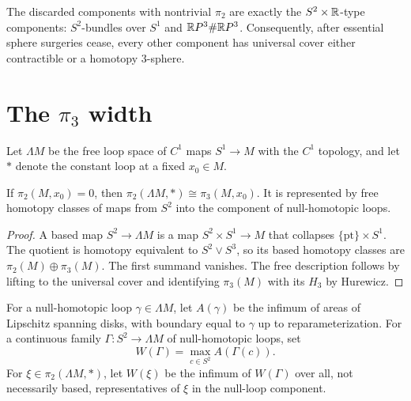 \begin{remark}
\label{rem:pi2-disappearing-components}

The discarded components with nontrivial $\pi_2$ are exactly the
$S^2\times\mathbb{R}$-type components: $S^2$-bundles over $S^1$ and
$\mathbb{R} P^3\#\mathbb{R} P^3$. Consequently, after essential sphere surgeries cease,
every other component has universal cover either contractible or a homotopy
$3$-sphere.
\end{remark}

\section{The $\pi_3$ width}

Let $\Lambda M$ be the free loop space of $C^1$ maps $S^1\to M$ with the
$C^1$ topology, and let $*$ denote the constant loop at a fixed $x_0\in M$.

\begin{claim}
\label{claim:loop-space-pi2-pi3-iso}
If $\pi_2(M,x_0)=0$, then
$\pi_2(\Lambda M,*)\cong\pi_3(M,x_0)$. It is represented by free homotopy
classes of maps from $S^2$ into the component of null-homotopic loops.
\end{claim}
\begin{proof}
\sketch A based map $S^2\to\Lambda M$ is a map $S^2\times S^1\to M$ that
collapses $\{\mathrm{pt}\}\times S^1$. The quotient is homotopy equivalent to
$S^2\vee S^3$, so its based homotopy classes are
$\pi_2(M)\oplus\pi_3(M)$. The first summand vanishes. The free description
follows by lifting to the universal cover and identifying $\pi_3(M)$ with its
$H_3$ by Hurewicz.
\end{proof}

\begin{definition}
\label{def:w-xi-spanning-disk-functional}
\label{Wdefn}

For a null-homotopic loop $\gamma\in\Lambda M$, let $A(\gamma)$ be the
infimum of areas of Lipschitz spanning disks, with boundary equal to $\gamma$
up to reparameterization. For a continuous family
$\Gamma\colon S^2\to\Lambda M$ of null-homotopic loops, set
\[
W(\Gamma)=\max_{c\in S^2}A(\Gamma(c)).
\]
For $\xi\in\pi_2(\Lambda M,*)$, let $W(\xi)$ be the infimum of $W(\Gamma)$
over all, not necessarily based, representatives of $\xi$ in the null-loop
component.
\end{definition}

